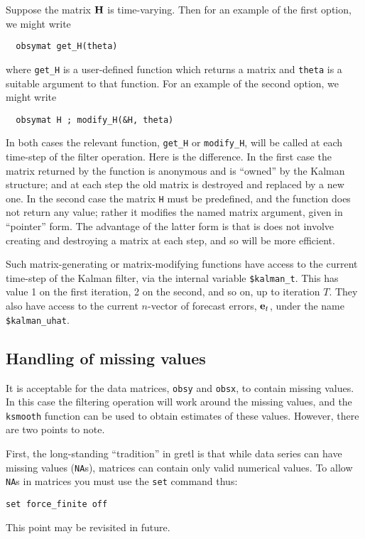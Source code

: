 \documentclass[a4paper]{article}
\newcommand{\obsmat}{\ensuremath\mathbf{H}}
\newcommand{\prederr}{\ensuremath\mathbf{e}}
\begin{document}
Suppose the matrix $\obsmat$ is time-varying.  Then for an example of
the first option, we might write
%
\begin{verbatim}
  obsymat get_H(theta)
\end{verbatim}
%
where \texttt{get\_H} is a user-defined function which returns a
matrix and \texttt{theta} is a suitable argument to that function.
For an example of the second option, we might write
%
\begin{verbatim}
  obsymat H ; modify_H(&H, theta)
\end{verbatim}

In both cases the relevant function, \verb+get_H+ or \verb+modify_H+,
will be called at each time-step of the filter operation.  Here is the
difference. In the first case the matrix returned by the function is
anonymous and is ``owned'' by the Kalman structure; and at each step
the old matrix is destroyed and replaced by a new one.  In the second
case the matrix \texttt{H} must be predefined, and the function does
not return any value; rather it modifies the named matrix argument,
given in ``pointer'' form.  The advantage of the latter form is that
is does not involve creating and destroying a matrix at each step, and
so will be more efficient.

Such matrix-generating or matrix-modifying functions have access to
the current time-step of the Kalman filter, via the internal variable
\verb+$kalman_t+.  This has value 1 on the first iteration, 2 on the
second, and so on, up to iteration $T$.  They also have access to
the current $n$-vector of forecast errors, $\prederr_t$, under the
name \verb+$kalman_uhat+.


\subsection{Handling of missing values}

It is acceptable for the data matrices, \texttt{obsy} and
\texttt{obsx}, to contain missing values.  In this case the filtering
operation will work around the missing values, and the \texttt{ksmooth}
function can be used to obtain estimates of these values.  However,
there are two points to note.

First, the long-standing ``tradition'' in gretl is that while data
series can have missing values (\texttt{NA}s), matrices can contain
only valid numerical values.  To allow \texttt{NA}s in matrices you
must use the \texttt{set} command thus:
%
\begin{verbatim}
set force_finite off
\end{verbatim}
%
This point may be revisited in future.  
\end{document}
